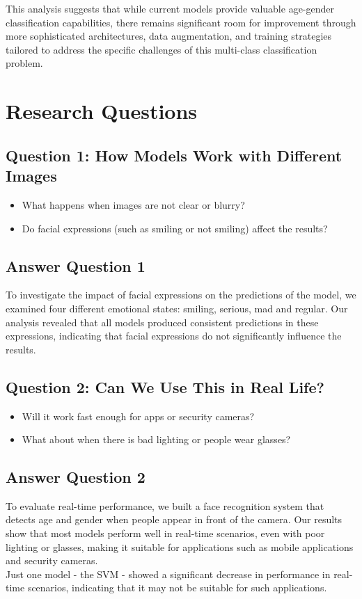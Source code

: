 \documentclass{article}
\begin{document}
This analysis suggests that while current models provide valuable age-gender classification capabilities, there remains significant room for improvement through more sophisticated architectures, data augmentation, and training strategies tailored to address the specific challenges of this multi-class classification problem.





\newpage
\section{Research Questions}

\subsection*{Question 1: How Models Work with Different Images}
\begin{itemize}[leftmargin=1.6cm]
    \item What happens when images are not clear or blurry?
    \item Do facial expressions (such as smiling or not smiling) affect the results?
\end{itemize}

\subsection*{Answer Question 1}
To investigate the impact of facial expressions on the predictions of the model,
we examined four different emotional states: smiling, serious, mad and regular. 
Our analysis revealed that all models produced consistent predictions in these expressions,
indicating that facial expressions do not significantly influence the results.


\subsection*{Question 2: Can We Use This in Real Life?}
\begin{itemize}[leftmargin=1.6cm]
    \item Will it work fast enough for apps or security cameras?
    \item What about when there is bad lighting or people wear glasses?
\end{itemize}

\subsection*{Answer Question 2}
To evaluate real-time performance, we built a face recognition system that detects age and gender when people appear in front of the camera.
Our results show that most models perform well in real-time scenarios, even with poor lighting or glasses, making it suitable for applications such as mobile applications and security cameras.  
\\ Just one model - the SVM - showed a significant decrease in performance in real-time scenarios, indicating that it may not be suitable for such applications.
 
\end{document}

